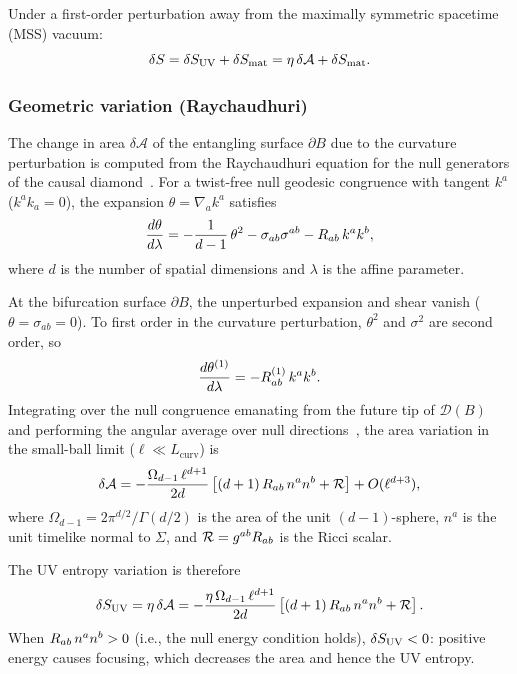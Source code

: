 Under a first-order perturbation away from the maximally symmetric
spacetime (MSS) vacuum:
\begin{equation}
  \delta S = \delta S_{\mathrm{UV}} + \delta S_{\mathrm{mat}}
  = \eta\, \delta\mathcal{A} + \delta S_{\mathrm{mat}}.
  \label{eq:ds-decomp}
\end{equation}

\subsubsection{Geometric variation (Raychaudhuri)}
\label{sec:raychaudhuri}

The change in area $\delta\mathcal{A}$ of the entangling surface
$\partial B$ due to the curvature perturbation is computed from the
Raychaudhuri equation for the null generators of the causal
diamond~\cite{Wald1984, Jacobson2016}.  For a twist-free null geodesic
congruence with tangent $k^a$ ($k^a k_a = 0$), the expansion
$\theta = \nabla_a k^a$ satisfies
\begin{equation}
  \frac{d\theta}{d\lambda}
  = -\frac{1}{d-1}\,\theta^2 - \sigma_{ab}\sigma^{ab} - R_{ab}\, k^a k^b,
  \label{eq:raychaudhuri}
\end{equation}
where $d$ is the number of spatial dimensions and $\lambda$ is the
affine parameter.

At the bifurcation surface $\partial B$, the unperturbed expansion and
shear vanish ($\theta = \sigma_{ab} = 0$).  To first order in the
curvature perturbation, $\theta^2$ and $\sigma^2$ are second order, so
\begin{equation}
  \frac{d\theta^{(1)}}{d\lambda} = -R_{ab}^{(1)}\, k^a k^b.
  \label{eq:ray-linear}
\end{equation}
Integrating over the null congruence emanating from the future tip of
$\mathcal{D}(B)$ and performing the angular average over null
directions~\cite{Jacobson2016}, the area variation in the small-ball
limit ($\ell \ll L_{\mathrm{curv}}$) is
\begin{equation}
  \delta\mathcal{A}
  = -\frac{\Omega_{d-1}\, \ell^{d+1}}{2d}
  \left[(d+1)\, R_{ab}\, n^a n^b + \mathcal{R}\right]
  + O(\ell^{d+3}),
  \label{eq:delta-area}
\end{equation}
where $\Omega_{d-1} = 2\pi^{d/2}/\Gamma(d/2)$ is the area of the unit
$(d{-}1)$-sphere, $n^a$ is the unit timelike normal to $\Sigma$, and
$\mathcal{R} = g^{ab}R_{ab}$ is the Ricci scalar.

The UV entropy variation is therefore
\begin{equation}
  \delta S_{\mathrm{UV}} = \eta\,\delta\mathcal{A}
  = -\frac{\eta\,\Omega_{d-1}\, \ell^{d+1}}{2d}
  \left[(d+1)\,R_{ab}\, n^a n^b + \mathcal{R}\right].
  \label{eq:ds-uv}
\end{equation}
When $R_{ab}\, n^a n^b > 0$ (i.e., the null energy condition holds),
$\delta S_{\mathrm{UV}} < 0$: positive energy causes focusing, which
decreases the area and hence the UV entropy.

